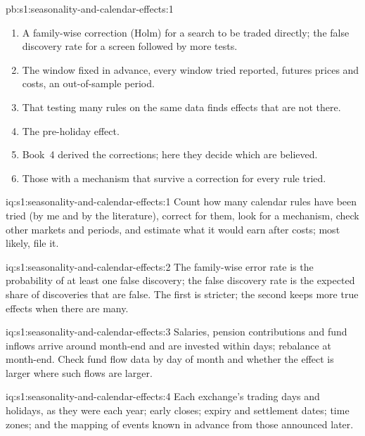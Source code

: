 \begin{solution}{pb:s1:seasonality-and-calendar-effects:1}
\begin{enumerate}
\item A family-wise correction (Holm) for a search to be traded directly; the false discovery rate for a screen followed by more tests.
\item The window fixed in advance, every window tried reported, futures prices and costs, an out-of-sample period.
\item That testing many rules on the same data finds effects that are not there.
\item The pre-holiday effect.
\item Book~4 derived the corrections; here they decide which  are believed.
\item Those with a mechanism that survive a correction for every rule tried.
\end{enumerate}
\end{solution}

\begin{solution}{iq:s1:seasonality-and-calendar-effects:1}
Count how many calendar rules have been tried (by me and by the literature), correct for them, look for a mechanism, check other markets and periods,
and estimate what it would earn after costs; most likely, file it.
\end{solution}

\begin{solution}{iq:s1:seasonality-and-calendar-effects:2}
The family-wise error rate is the probability of at least one false discovery; the false discovery rate is the expected share of discoveries that are
false. The first is stricter; the second keeps more true effects when there are many.
\end{solution}

\begin{solution}{iq:s1:seasonality-and-calendar-effects:3}
Salaries, pension contributions and fund inflows arrive around month-end and are invested within days;  rebalance at month-end. Check fund
flow data by day of month and whether the effect is larger where such flows are larger.
\end{solution}

\begin{solution}{iq:s1:seasonality-and-calendar-effects:4}
Each exchange's trading days and holidays, as they were each year; early closes; expiry and settlement dates; time zones; and the mapping of events
known in advance from those announced later.
\end{solution}

